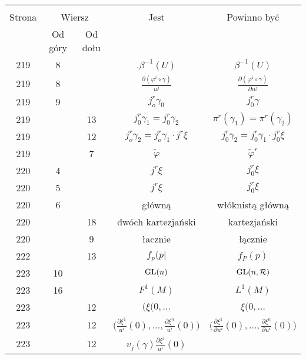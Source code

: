 \documentclass[a4paper,11pt]{article}
\begin{document}
\begin{center}
  \begin{tabular}{|c|c|c|c|c|}
    \hline
    & \multicolumn{2}{c|}{} & & \\
    Strona & \multicolumn{2}{c|}{Wiersz} & Jest
                              & Powinno być \\ \cline{2-3}
    & Od góry & Od dołu & & \\
    \hline
    219 &  8 & & $.\beta^{ -1 }( U )$ & $\beta^{ -1 }( U )$ \\[0.3em]
    219 &  8 & & $\frac{ \partial ( \varphi^{ i } \circ \gamma ) }{ u^{ j } }$
           & $\frac{ \partial ( \varphi^{ i } \circ \gamma ) }{ \partial u^{ j } }$ \\[0.3em]
    219 &  9 & & $j_{ o }^{ r } \gamma_{ 0 }$ & $j_{ 0 }^{ r } \gamma$ \\
    219 & & 13 & $j_{ 0 }^{ r } \gamma_{ 1 } = j_{ 0 }^{ r } \gamma_{ 2 }$
           & $\pi^{ r } ( \gamma_{ 1 } ) = \pi^{ r }( \gamma_{ 2 } )$ \\
    219 & & 12 & $j^{ r }_{ o } \gamma_{ 2 }
                 = j^{ r }_{ o } \gamma_{ 1 } \cdot j^{ r } \xi$
           & $j^{ r }_{ 0 } \gamma_{ 2 }
             = j^{ r }_{ 0 } \gamma_{ 1 } \cdot j^{ r }_{ 0 } \xi$ \\
    219 & &  7 & $\widetilde{ \varphi }$ & $\widetilde{ \varphi }^{ r }$ \\
    220 &  4 & & $j^{ r } \xi$ & $j^{ r }_{ 0 } \xi$ \\
    220 &  5 & & $j^{ r } \xi$ & $j^{ r }_{ 0 } \xi$ \\
    220 &  6 & & główną & włóknistą główną \\
    220 & & 18 & dwóch kartezjański & kartezjański \\
    220 & &  9 & łacznie & łącznie \\
    222 & & 13 & $f_{ p }( p |$ & $f_{ P }( p )$ \\
    223 & 10 & & $\mathrm{GL}( n )$ & $\mathrm{GL}( n, \mathcal{R} )$ \\
    223 & 16 & & $F^{ 1 }( M )$ & $L^{ 1 }( M )$ \\
    223 & & 12 & $( \xi( 0, \ldots$ & $\xi( 0, \ldots$ \\[0.4em]
    223 & & 12 & $\big( \frac{ \partial \xi^{ 1 } }{ u^{ i } }( 0 ), \ldots,
                 \frac{ \partial \xi^{ n } }{ u^{ i } }( 0 ) \big)$
           & $\big( \frac{ \partial \xi^{ 1 } }{ \partial u^{ i } }( 0 ), \ldots,
             \frac{ \partial \xi^{ n } }{ \partial u^{ i } }( 0 ) \big)$ \\[0.5em]
    223 & & 12 & $v_{ j }( \gamma ) \frac{ \partial \xi ^{ j } }{ u^{ i } }( 0 )$

\end{tabular}
\end{center}
\end{document}
